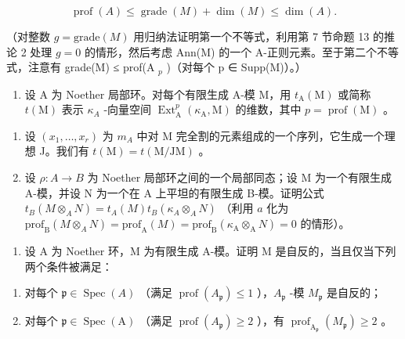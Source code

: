 \[
\operatorname{prof} (A) \leqslant \operatorname{grade} (M) + \dim (M) \leqslant \dim (A).
\]

（对整数 \(g = \text{grade}(M)\) 用归纳法证明第一个不等式，利用第 7 节命题 13 的推论 2 处理 \(g = 0\) 的情形，然后考虑 Ann(M) 的一个 A-正则元素。至于第二个不等式，注意有 grade(M) ≤ prof(A \(_{p}\) )（对每个 p ∈ Supp(M)）。）

\begin{enumerate}
\def\labelenumi{\arabic{enumi})}
\setcounter{enumi}{15}
\tightlist
\item
  设 A 为 Noether 局部环。对每个有限生成 A-模 M，用 \(t_{\mathrm{A}}(\mathrm{M})\) 或简称 \(t(\mathrm{M})\) 表示 \(\kappa_{A}\) -向量空间 \(\operatorname{Ext}_{\mathrm{A}}^{p}(\kappa_{\mathrm{A}},\mathrm{M})\) 的维数，其中 \(p=\operatorname{prof}(\mathrm{M})\) 。
\end{enumerate}

\begin{enumerate}
\def\labelenumi{\alph{enumi})}
\item
  设 \((x_{1},\ldots,x_{r})\) 为 \(m_{A}\) 中对 M 完全割的元素组成的一个序列，它生成一个理想 J。我们有 \(t(\mathrm{M})=t(\mathrm{M}/\mathrm{JM})\) 。
\item
  设 \(\rho : A \to B\) 为 Noether 局部环之间的一个局部同态；设 M 为一个有限生成 A-模，并设 N 为一个在 A 上平坦的有限生成 B-模。证明公式 \(t_{B}(M \otimes_{A} N) = t_{A}(M)t_{B}(\kappa_{A} \otimes_{A} N)\) （利用 \(a\) 化为 \(\mathrm{prof}_{\mathrm{B}}(M \otimes_{A} N) = \mathrm{prof}_{\mathrm{A}}(M) = \mathrm{prof}_{\mathrm{B}}(\kappa_{\mathrm{A}} \otimes_{\mathrm{A}} N) = 0\) 的情形）。
\end{enumerate}

\begin{enumerate}
\def\labelenumi{\arabic{enumi})}
\setcounter{enumi}{16}
\tightlist
\item
  设 A 为 Noether 环，M 为有限生成 A-模。证明 M 是自反的，当且仅当下列两个条件被满足：
\end{enumerate}

\begin{enumerate}
\def\labelenumi{(\roman{enumi})}
\item
  对每个 \(\mathfrak{p} \in \operatorname{Spec}(A)\) （满足 \(\operatorname{prof}(A_{\mathfrak{p}}) \leqslant 1\) ），\(A_{\mathfrak{p}}\) -模 \(M_{\mathfrak{p}}\) 是自反的；
\item
  对每个 \(\mathfrak{p} \in \operatorname{Spec}(\mathrm{A})\) （满足 \(\operatorname{prof}(A_{\mathfrak{p}}) \geqslant 2\) ），有 \(\operatorname{prof}_{\mathrm{A}_{\mathfrak{p}}} (M_{\mathfrak{p}}) \geqslant 2\) 。
\end{enumerate}

